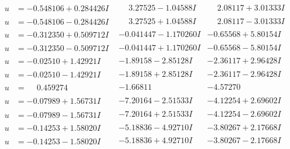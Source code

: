 \documentclass[1p]{elsarticle_modified}
\theoremstyle{definition}
\begin{document}
$$\begin{array}{c|c|c}
\begin{aligned}
u &= -0.548106 + 0.284426 I\end{aligned}
 & \phantom{-}3.27525 - 1.04588 I & \phantom{-}2.08117 + 3.01333 I \\ \hline\begin{aligned}
u &= -0.548106 - 0.284426 I\end{aligned}
 & \phantom{-}3.27525 + 1.04588 I & \phantom{-}2.08117 - 3.01333 I \\ \hline\begin{aligned}
u &= -0.312350 + 0.509712 I\end{aligned}
 & -0.041447 - 1.170260 I & -0.65568 + 5.80154 I \\ \hline\begin{aligned}
u &= -0.312350 - 0.509712 I\end{aligned}
 & -0.041447 + 1.170260 I & -0.65568 - 5.80154 I \\ \hline\begin{aligned}
u &= -0.02510 + 1.42921 I\end{aligned}
 & -1.89158 - 2.85128 I & -2.36117 + 2.96428 I \\ \hline\begin{aligned}
u &= -0.02510 - 1.42921 I\end{aligned}
 & -1.89158 + 2.85128 I & -2.36117 - 2.96428 I \\ \hline\begin{aligned}
u &= \phantom{-}0.459274\phantom{ +0.000000I}\end{aligned}
 & -1.66811\phantom{ +0.000000I} & -4.57270\phantom{ +0.000000I} \\ \hline\begin{aligned}
u &= -0.07989 + 1.56731 I\end{aligned}
 & -7.20164 - 2.51533 I & -4.12254 + 2.69602 I \\ \hline\begin{aligned}
u &= -0.07989 - 1.56731 I\end{aligned}
 & -7.20164 + 2.51533 I & -4.12254 - 2.69602 I \\ \hline\begin{aligned}
u &= -0.14253 + 1.58020 I\end{aligned}
 & -5.18836 - 4.92710 I & -3.80267 + 2.17668 I \\ \hline\begin{aligned}
u &= -0.14253 - 1.58020 I\end{aligned}
 & -5.18836 + 4.92710 I & -3.80267 - 2.17668 I \\ \hline\begin{aligned}

\end{aligned}
\end{array}$$
\end{document}

